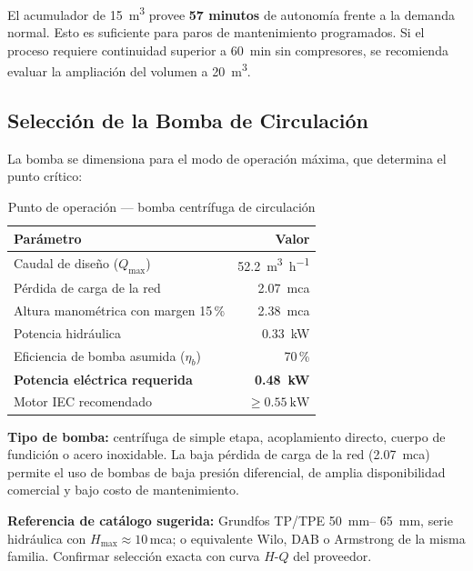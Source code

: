 \documentclass[11pt,a4paper]{article}
\begin{document}
El acumulador de \SI{15}{\cubic\metre} provee \textbf{57 minutos} de autonomía frente a
la demanda normal. Esto es suficiente para paros de mantenimiento programados. Si el
proceso requiere continuidad superior a \SI{60}{\minute} sin compresores, se recomienda
evaluar la ampliación del volumen a \SI{20}{\cubic\metre}.


\subsection{Selección de la Bomba de Circulación}

La bomba se dimensiona para el modo de operación máxima, que determina el punto crítico:

\begin{table}[h!]
\centering
\caption{Punto de operación — bomba centrífuga de circulación}
\label{tab:bomba}
\begin{tabular}{@{}lr@{}}
\toprule
\textbf{Parámetro} & \textbf{Valor} \\
\midrule
Caudal de diseño ($Q_{\max}$) & \SI{52.2}{\cubic\metre\per\hour} \\
Pérdida de carga de la red & \SI{2.07}{mca} \\
Altura manométrica con margen 15\,\% & \SI{2.38}{mca} \\
Potencia hidráulica & \SI{0.33}{\kilo\watt} \\
Eficiencia de bomba asumida ($\eta_b$) & 70\,\% \\
\textbf{Potencia eléctrica requerida} & \textbf{\SI{0.48}{\kilo\watt}} \\
Motor IEC recomendado & $\geq \SI{0.55}{\kilo\watt}$ \\
\bottomrule
\end{tabular}
\end{table}

\textbf{Tipo de bomba:} centrífuga de simple etapa, acoplamiento directo, cuerpo de
fundición o acero inoxidable. La baja pérdida de carga de la red (\SI{2.07}{mca}) permite
el uso de bombas de baja presión diferencial, de amplia disponibilidad comercial y bajo
costo de mantenimiento.

\textbf{Referencia de catálogo sugerida:} Grundfos TP/TPE \SI{50}{\milli\metre}–
\SI{65}{\milli\metre}, serie hidráulica con $H_{\max} \approx 10$\,mca; o equivalente
Wilo, DAB o Armstrong de la misma familia. Confirmar selección exacta con curva $H$-$Q$
del proveedor.


\end{document}
